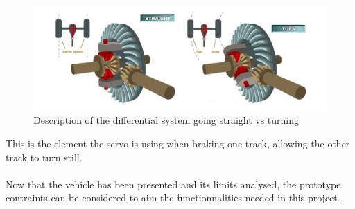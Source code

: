 \begin{figure}[H]
	\centering
	\includegraphics[scale=0.7]{figures/diffGearFull}
	\caption{Description of the differential system going straight vs turning \cite{MechanicalEngineering}}
	\label{diffGearFull}
\end{figure}

This is the element the servo is using when braking one track, allowing the other track to turn still.\\\\

Now that the vehicle has been presented and its limits analysed, the prototype contraints can be considered to aim the functionnalities needed in this project.

